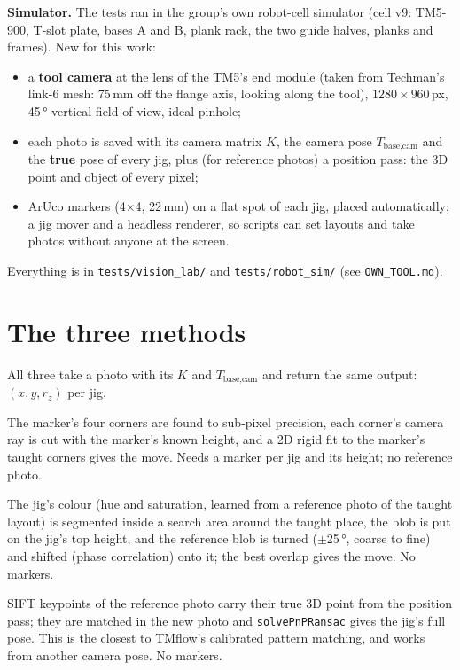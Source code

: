 \documentclass[11pt,a4paper]{article}
\newcommand{\code}[1]{\texttt{\small #1}}
\begin{document}
\textbf{Simulator.} The tests ran in the group's own robot-cell simulator (cell v9: TM5-900, T-slot plate, bases A and B,
plank rack, the two guide halves, planks and frames). New for this work:
\begin{itemize}
\item a \textbf{tool camera} at the lens of the TM5's end module (taken from Techman's link-6 mesh: 75\,mm off the flange
axis, looking along the tool), $1280\times960$\,px, 45\,° vertical field of view, ideal pinhole;
\item each photo is saved with its camera matrix $K$, the camera pose $T_\text{base,cam}$ and the \textbf{true} pose of every
jig, plus (for reference photos) a position pass: the 3D point and object of every pixel;
\item ArUco markers (4$\times$4, 22\,mm) on a flat spot of each jig, placed automatically; a jig mover and a headless
renderer, so scripts can set layouts and take photos without anyone at the screen.
\end{itemize}
Everything is in \code{tests/vision\_lab/} and \code{tests/robot\_sim/} (see \code{OWN\_TOOL.md}).

\section{The three methods}
All three take a photo with its $K$ and $T_\text{base,cam}$ and return the same output: $(x, y, r_z)$ per jig.
\begin{description}[leftmargin=0pt,labelsep=4pt]
\item[ArUco markers.] The marker's four corners are found to sub-pixel precision, each corner's camera ray is cut with
the marker's known height, and a 2D rigid fit to the marker's taught corners gives the move. Needs a marker per jig and
its height; no reference photo.
\item[Colour.] The jig's colour (hue and saturation, learned from a reference photo of the taught layout) is segmented
inside a search area around the taught place, the blob is put on the jig's top height, and the reference blob is turned
($\pm$25\,°, coarse to fine) and shifted (phase correlation) onto it; the best overlap gives the move. No markers.
\item[Features (SIFT + PnP).] SIFT keypoints of the reference photo carry their true 3D point from the position pass;
they are matched in the new photo and \code{solvePnPRansac} gives the jig's full pose. This is the closest to TMflow's
calibrated pattern matching, and works from another camera pose. No markers.
\end{description}
\end{document}
